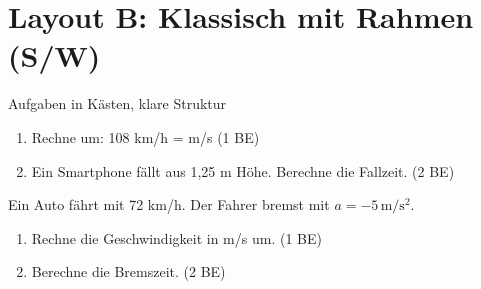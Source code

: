 \documentclass[11pt,a4paper]{article}
\begin{document}
\newpage
\section*{Layout B: Klassisch mit Rahmen (S/W)}
\vspace{-0.3cm}
{\small Aufgaben in Kästen, klare Struktur}

\vspace{0.5cm}


\vspace{0.5cm}

\noindent{}

\vspace{0.3cm}
\begin{enumerate}
\item[a)] Rechne um: 108 km/h = \underline{\hspace{2cm}} m/s \hfill (1 BE)
\item[b)] Ein Smartphone fällt aus 1,25 m Höhe. Berechne die Fallzeit. \hfill (2 BE)
\end{enumerate}

\vspace{0.5cm}

\noindent{}

\vspace{0.3cm}
Ein Auto fährt mit 72 km/h. Der Fahrer bremst mit $a = -5\,\mathrm{m/s^2}$.

\begin{enumerate}
\item[a)] Rechne die Geschwindigkeit in m/s um. \hfill (1 BE)
\item[b)] Berechne die Bremszeit. \hfill (2 BE)
\end{enumerate}

\vspace{1cm}

\newpage
\end{document}
